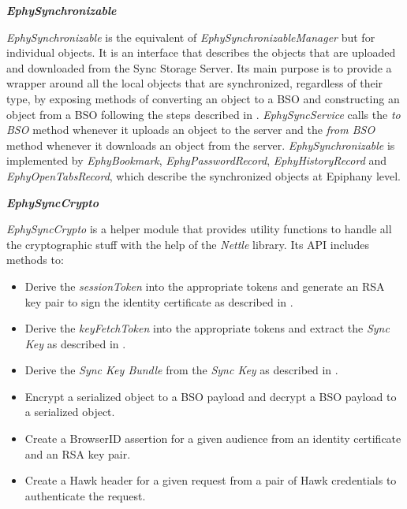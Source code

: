 \textbf{\textit{EphySynchronizable}}

\textit{EphySynchronizable} is the equivalent of \textit{EphySynchronizableManager} but for individual objects. It is an interface that describes the objects that are uploaded and downloaded from the Sync Storage Server. Its main purpose is to provide a wrapper around all the local objects that are synchronized, regardless of their type, by exposing methods of converting an object to a BSO and constructing an object from a BSO following the steps described in . \textit{EphySyncService} calls the \textit{to BSO} method whenever it uploads an object to the server and the \textit{from BSO} method whenever it downloads an object from the server. \textit{EphySynchronizable} is implemented by \textit{EphyBookmark}, \textit{EphyPasswordRecord}, \textit{EphyHistoryRecord} and \textit{EphyOpenTabsRecord}, which describe the synchronized objects at Epiphany level.

\textbf{\textit{EphySyncCrypto}}

\textit{EphySyncCrypto} is a helper module that provides utility functions to handle all the cryptographic stuff with the help of the \textit{Nettle} library. Its API includes methods to:

\begin{itemize}
  \item Derive the \textit{sessionToken} into the appropriate tokens and generate an RSA key pair to sign the identity certificate as described in .
  \item Derive the \textit{keyFetchToken} into the appropriate tokens and extract the \textit{Sync Key} as described in .
  \item Derive the \textit{Sync Key Bundle} from the \textit{Sync Key} as described in .
  \item Encrypt a serialized object to a BSO payload and decrypt a BSO payload to a serialized object.
  \item Create a BrowserID assertion for a given audience from an identity certificate and an RSA key pair.
  \item Create a Hawk header for a given request from a pair of Hawk credentials to authenticate the request.
\end{itemize}

